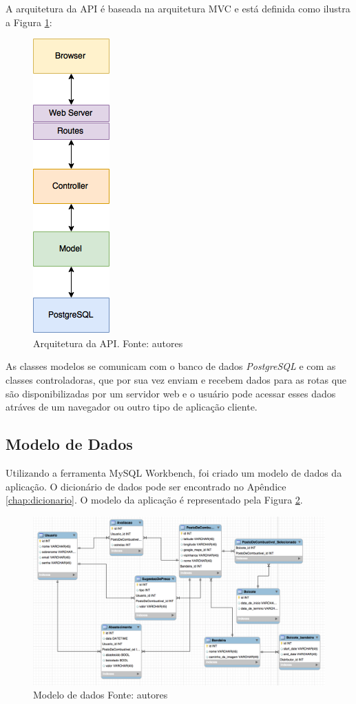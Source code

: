 A arquitetura da API é baseada na arquitetura MVC e está definida como ilustra a Figura \ref{img:arquitetura}:

\begin{figure}[H]
    \centering
    \includegraphics[scale=0.5]{figuras/api_arch.png}
    \caption[Arquitetura da API]{Arquitetura da API. Fonte: autores}
    \label{img:arquitetura}
\end{figure}

As classes modelos se comunicam com o banco de dados \textit{PostgreSQL} e com as classes controladoras, que por sua vez enviam e recebem dados para as rotas que são disponibilizadas por um servidor web e o usuário pode acessar esses dados atráves de um navegador ou outro tipo de aplicação cliente.

\subsection{Modelo de Dados}

Utilizando a ferramenta MySQL Workbench, foi criado um modelo de dados da aplicação. O dicionário de dados pode ser encontrado no Apêndice \ref{chap:dicionario}. O modelo da aplicação é representado pela Figura \ref{img:modelo_de_dados}.

\begin{figure}[H]
    \centering
    \includegraphics[scale=0.5]{figuras/modelagem_traduzida.png}
    \caption[Modelo de dados]{Modelo de dados Fonte: autores}
    \label{img:modelo_de_dados}
\end{figure}
